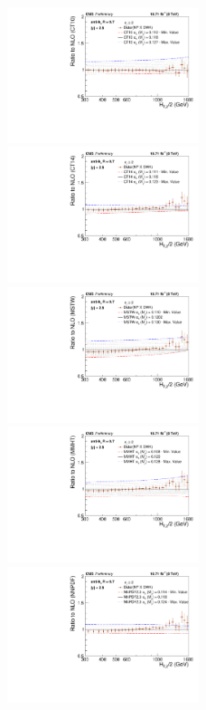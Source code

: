\begin{figure}[!htbp]
  \begin{center}
    \includegraphics[width=0.5\textwidth]{Plots_HT_2_150/Sensitivity_Pdfs/Sensitivity_2_ratio_NLO_CT10_EW.pdf}%
    \includegraphics[width=0.5\textwidth]{Plots_HT_2_150/Sensitivity_Pdfs/Sensitivity_2_ratio_NLO_CT14_EW.pdf}\\
    \includegraphics[width=0.5\textwidth]{Plots_HT_2_150/Sensitivity_Pdfs/Sensitivity_2_ratio_NLO_MSTW2008_EW.pdf}%
    \includegraphics[width=0.5\textwidth]{Plots_HT_2_150/Sensitivity_Pdfs/Sensitivity_2_ratio_NLO_MMHT2014_EW.pdf}\\
    \includegraphics[width=0.5\textwidth]{Plots_HT_2_150/Sensitivity_Pdfs/Sensitivity_2_ratio_NLO_NNPDF23_EW.pdf}

\end{center}
\end{figure}
